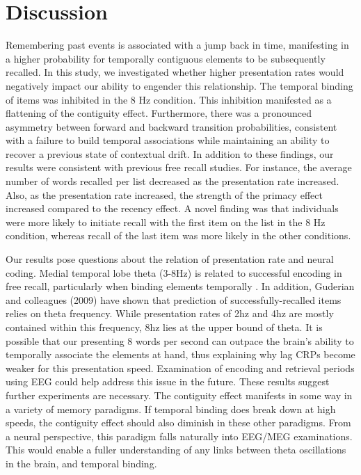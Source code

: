 \documentclass[10pt,letterpaper]{article}
\begin{document}
\section{Discussion}

Remembering past events is associated with a jump back in time, manifesting in a higher probability for temporally contiguous elements to be subsequently recalled. In this study, we investigated whether higher presentation rates would negatively impact our ability to engender this relationship. The temporal binding of items was inhibited in the 8 Hz condition. This inhibition manifested as a flattening of the contiguity effect. Furthermore, there was a pronounced asymmetry between forward and backward transition probabilities, consistent with a failure to build temporal associations while maintaining an ability to recover a previous state of contextual drift. In addition to these findings, our results were consistent with previous free recall studies. For instance, the average number of words recalled per list decreased as the presentation rate increased. Also, as the presentation rate increased, the strength of the primacy effect increased compared to the recency effect. A novel finding was that individuals were more likely to initiate recall with the first item on the list in the 8 Hz condition, whereas recall of the last item was more likely in the other conditions. %

Our results pose questions about the relation of presentation rate and neural coding. Medial temporal lobe theta (3-8Hz) is related to successful encoding in free recall, particularly when binding elements temporally \cite{NyhuCurr10}. In addition, Guderian and colleagues (2009) have shown that prediction of successfully-recalled items relies on theta frequency. While presentation rates of 2hz and 4hz are mostly contained within this frequency, 8hz lies at the upper bound of theta. It is possible that our presenting 8 words per second can outpace the brain's ability to temporally associate the elements at hand, thus explaining why lag CRPs become weaker for this presentation speed. Examination of encoding and retrieval periods using EEG could help address this issue in the future. These results suggest further experiments are necessary. The contiguity effect manifests in some way in a variety of memory paradigms. If temporal binding does break down at high speeds, the contiguity effect should also diminish in these other paradigms. From a neural perspective, this paradigm falls naturally into EEG/MEG examinations. This would enable a fuller understanding of any links between theta oscillations in the brain, and temporal binding.
\end{document}
